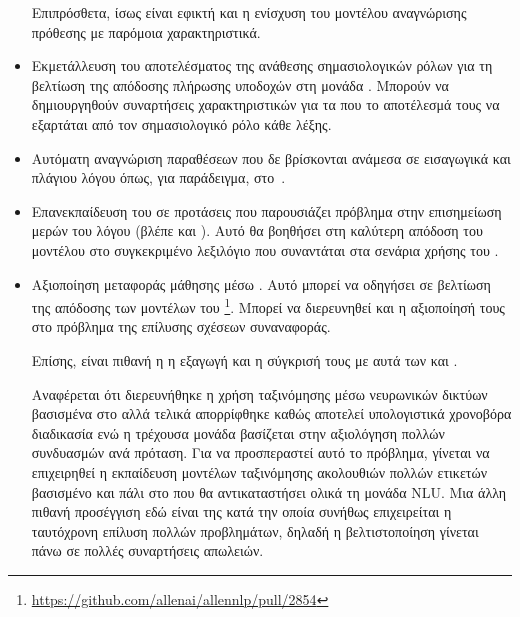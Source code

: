 \begin{itemize}
          Επιπρόσθετα, ίσως είναι εφικτή και η ενίσχυση του μοντέλου αναγνώρισης πρόθεσης με παρόμοια χαρακτηριστικά.
    \item Εκμετάλλευση του αποτελέσματος της ανάθεσης σημασιολογικών ρόλων για τη βελτίωση της απόδοσης πλήρωσης υποδοχών στη μονάδα \NLU{}.
          Μπορούν να δημιουργηθούν συναρτήσεις χαρακτηριστικών για τα \CRFR{} που το αποτέλεσμά τους να εξαρτάται από τον σημασιολογικό ρόλο κάθε λέξης.
    \item Αυτόματη αναγνώριση παραθέσεων που δε βρίσκονται ανάμεσα σε εισαγωγικά και πλάγιου λόγου όπως, για παράδειγμα, στο~\cite{pareti2013automatically}.
    \item Επανεκπαίδευση του  σε προτάσεις που παρουσιάζει πρόβλημα στην επισημείωση μερών του λόγου (βλέπε και ).
          Αυτό θα βοηθήσει στη καλύτερη απόδοση του μοντέλου στο συγκεκριμένο λεξιλόγιο που συναντάται στα σενάρια χρήσης του \projectname{}.
    \item Αξιοποίηση μεταφοράς μάθησης μέσω .
          Αυτό μπορεί να οδηγήσει σε βελτίωση της απόδοσης των μοντέλων του \footnote{\url{https://github.com/allenai/allennlp/pull/2854}}.
          Μπορεί να διερευνηθεί και η αξιοποίησή τους στο πρόβλημα της επίλυσης σχέσεων συναναφοράς.

          Επίσης, είναι πιθανή η η εξαγωγή  και η σύγκρισή τους με αυτά των  και .

          Αναφέρεται ότι διερευνήθηκε η χρήση ταξινόμησης μέσω νευρωνικών δικτύων βασισμένα στο  αλλά τελικά απορρίφθηκε καθώς αποτελεί υπολογιστικά χρονοβόρα διαδικασία
          ενώ η τρέχουσα μονάδα \NLU{} βασίζεται στην αξιολόγηση πολλών συνδυασμών ανά πρόταση.
          Για να προσπεραστεί αυτό το πρόβλημα, γίνεται να επιχειρηθεί η εκπαίδευση μοντέλων ταξινόμησης ακολουθιών πολλών ετικετών βασισμένο και πάλι στο  που θα αντικαταστήσει ολικά τη μονάδα NLU.
          Μια άλλη πιθανή προσέγγιση εδώ είναι της  κατά την οποία συνήθως επιχειρείται η ταυτόχρονη επίλυση πολλών προβλημάτων,
          δηλαδή η βελτιστοποίηση γίνεται πάνω σε πολλές συναρτήσεις απωλειών.
\end{itemize}

